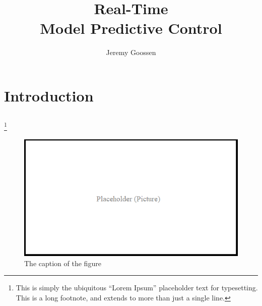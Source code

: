 \documentclass[12pt, oneside]{report}
\title{Real-Time \\ Model Predictive Control}
\author{Jeremy Goossen}
\begin{document}
\frontmatter %

\maketitle
\makesignatures
\makecopyright

\unpacklipsum[1-3]
\makeabstract{\lipsumexp}



\tableofcontents
\listoftables
\listoffigures





\mainmatter %

\chapter{Introduction}
\lipsum[1]
\section{\lipsum[150][1-3]}
\lipsum[3]%
\footnote{This is simply the ubiquitous ``Lorem Ipsum'' placeholder text for typesetting. This is a long footnote, and extends to more than just a single line.}

\begin{figure}[h]
  \centering
  \includegraphics[width=.7\textwidth]{figures/pictures/placeholder}
  \caption{The caption of the figure}
  \label{fig:BlockDiagram1}
\end{figure}
  
\end{document}
